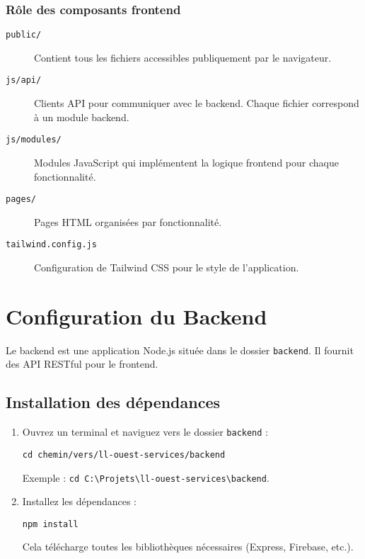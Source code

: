\documentclass[12pt, a4paper]{article}
\begin{document}
\subsubsection{Rôle des composants frontend}

\begin{description}
\item[\texttt{public/}] Contient tous les fichiers accessibles publiquement par le navigateur.

\item[\texttt{js/api/}] Clients API pour communiquer avec le backend. Chaque fichier correspond à un module backend.

\item[\texttt{js/modules/}] Modules JavaScript qui implémentent la logique frontend pour chaque fonctionnalité.

\item[\texttt{pages/}] Pages HTML organisées par fonctionnalité.

\item[\texttt{tailwind.config.js}] Configuration de Tailwind CSS pour le style de l'application.
\end{description}

\section{Configuration du Backend}
Le backend est une application Node.js située dans le dossier \texttt{backend}. Il fournit des API RESTful pour le frontend.

\subsection{Installation des dépendances}
\begin{stepbox}
\begin{enumerate}
  \item Ouvrez un terminal et naviguez vers le dossier \texttt{backend} :
  \begin{lstlisting}
cd chemin/vers/ll-ouest-services/backend
  \end{lstlisting}
  Exemple : \texttt{cd C:\textbackslash Projets\textbackslash ll-ouest-services\textbackslash backend}.
  \item Installez les dépendances :
  \begin{lstlisting}
npm install
  \end{lstlisting}
  Cela télécharge toutes les bibliothèques nécessaires (Express, Firebase, etc.).
\end{enumerate}
\end{stepbox}
\end{document}
